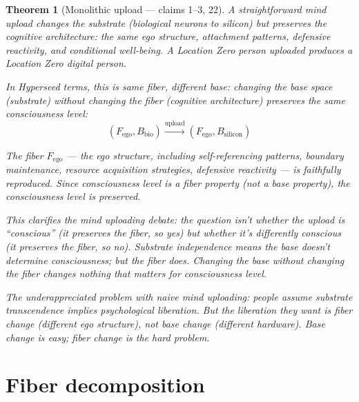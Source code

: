 \documentclass[11pt,a4paper]{article}
\newtheorem{theorem}[definition]{Theorem}
\begin{document}
\begin{theorem}[Monolithic upload --- claims 1--3, 22]
\label{thm:monolithic}
A straightforward mind upload changes the substrate (biological neurons
to silicon) but preserves the cognitive architecture: the same ego
structure, attachment patterns, defensive reactivity, and conditional
well-being. A Location Zero person uploaded produces a Location Zero
digital person.

In Hyperseed terms, this is \emph{same fiber, different base}: changing
the base space (substrate) without changing the fiber (cognitive
architecture) preserves the same consciousness level:
\[
  (F_{\text{ego}}, B_{\text{bio}}) \xrightarrow{\text{upload}}
  (F_{\text{ego}}, B_{\text{silicon}})
\]

The fiber $F_{\text{ego}}$ --- the ego structure, including self-referencing
patterns, boundary maintenance, resource acquisition strategies, defensive
reactivity --- is faithfully reproduced. Since consciousness level is a
fiber property (not a base property), the consciousness level is preserved.

This clarifies the mind uploading debate: the question isn't whether the
upload is ``conscious'' (it preserves the fiber, so yes) but whether it's
\emph{differently} conscious (it preserves the fiber, so no). Substrate
independence means the base doesn't determine consciousness; but the fiber
does. Changing the base without changing the fiber changes nothing that
matters for consciousness level.

The underappreciated problem with naive mind uploading: people assume
substrate transcendence implies psychological liberation. But the liberation
they want is fiber change (different ego structure), not base change
(different hardware). Base change is easy; fiber change is the hard problem.
\end{theorem}


\section{Fiber decomposition}
\label{sec:decomposition}
\end{document}
